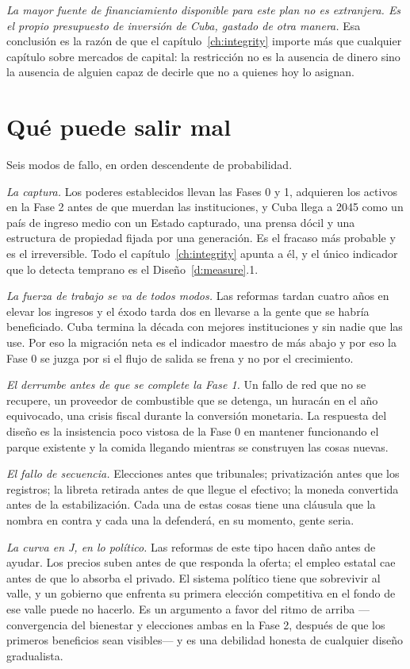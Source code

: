 \emph{La mayor fuente de financiamiento disponible para este plan no es extranjera. Es el propio
presupuesto de inversión de Cuba, gastado de otra manera.} Esa conclusión es la razón de que el
capítulo~\ref{ch:integrity} importe más que cualquier capítulo sobre mercados de capital: la
restricción no es la ausencia de dinero sino la ausencia de alguien capaz de decirle que no a quienes
hoy lo asignan.

\section{Qué puede salir mal}

Seis modos de fallo, en orden descendente de probabilidad.

\emph{La captura.} Los poderes establecidos llevan las Fases 0 y 1, adquieren los activos en la Fase 2
antes de que muerdan las instituciones, y Cuba llega a 2045 como un país de ingreso medio con un
Estado capturado, una prensa dócil y una estructura de propiedad fijada por una generación. Es el
fracaso más probable y es el irreversible. Todo el capítulo~\ref{ch:integrity} apunta a él, y el
único indicador que lo detecta temprano es el Diseño~\ref{d:measure}.1.

\emph{La fuerza de trabajo se va de todos modos.} Las reformas tardan cuatro años en elevar los
ingresos y el éxodo tarda dos en llevarse a la gente que se habría beneficiado. Cuba termina la
década con mejores instituciones y sin nadie que las use. Por eso la migración neta es el indicador
maestro de más abajo y por eso la Fase 0 se juzga por si el flujo de salida se frena y no por el
crecimiento.

\emph{El derrumbe antes de que se complete la Fase 1.} Un fallo de red que no se recupere, un
proveedor de combustible que se detenga, un huracán en el año equivocado, una crisis fiscal durante
la conversión monetaria. La respuesta del diseño es la insistencia poco vistosa de la Fase 0 en
mantener funcionando el parque existente y la comida llegando mientras se construyen las cosas
nuevas.

\emph{El fallo de secuencia.} Elecciones antes que tribunales; privatización antes que los registros;
la libreta retirada antes de que llegue el efectivo; la moneda convertida antes de la estabilización.
Cada una de estas cosas tiene una cláusula que la nombra en contra y cada una la defenderá, en su
momento, gente seria.

\emph{La curva en J, en lo político.} Las reformas de este tipo hacen daño antes de ayudar. Los
precios suben antes de que responda la oferta; el empleo estatal cae antes de que lo absorba el
privado. El sistema político tiene que sobrevivir al valle, y un gobierno que enfrenta su primera
elección competitiva en el fondo de ese valle puede no hacerlo. Es un argumento a favor del ritmo de
arriba ---convergencia del bienestar y elecciones ambas en la Fase 2, después de que los primeros
beneficios sean visibles--- y es una debilidad honesta de cualquier diseño gradualista.


